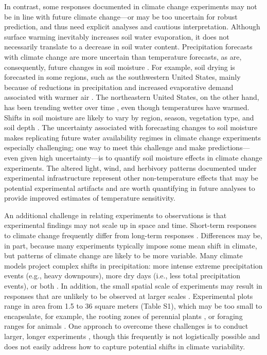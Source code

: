 \documentclass{article}
\begin{document}
\par In contrast, some responses documented in climate change experiments may not be in line with future climate change---or may be too uncertain for robust prediction, and thus need explicit analyses and cautious interpretation. Although surface warming inevitably increases soil water evaporation, it does not necessarily translate to a decrease in soil water content. Precipitation forecasts with climate change are more uncertain than temperature forecasts, as are, consequently, future changes in soil moisture \citep{cook2018}. For example, soil drying is forecasted in some regions, such as the southwestern United States, mainly because of reductions in precipitation and increased evaporative demand associated with warmer air \citep{dai2013,seager2013}. The northeastern United States, on the other hand, has been trending wetter over time \citep{shuman2017}, even though temperatures have warmed. Shifts in soil moisture are likely to vary by region, season, vegetation type, and soil depth \citep{seager2014,berg2017,cook2018}. The uncertainty associated with forecasting changes to soil moisture makes replicating future water availability regimes in climate change experiments especially challenging; one way to meet this challenge and make predictions---even given high uncertainty---is to quantify soil moisture effects in climate change experiments. The altered light, wind, and herbivory patterns documented under experimental infrastructure \citep{kennedy1995,moise2010,wolkovich2012,hoeppner2012, clark2014b} represent other non-temperature effects that may be potential experimental artifacts and are worth quantifying in future analyses to provide improved estimates of temperature sensitivity.
\par An additional challenge in relating experiments to observations is that experimental findings may not scale up in space and time. Short-term responses to climate change frequently differ from long-term responses \citep{woodward1992,elmendorf2012, andresen2016, reich2018}. Differences may be, in part, because many experiments typically impose some mean shift in climate, but patterns of climate change are likely to be more variable. Many climate models project complex shifts in precipitation: more intense extreme precipitation events (e.g., heavy downpours), more dry days (i.e., less total precipitation events), or both \citep{polade2014}. In addition, the small spatial scale of experiments may result in responses that are unlikely to be observed at larger scales \citep{woodward1992,menke2014}. Experimental plots range in area from 1.5 to 36 square meters (Table S1), which may be too small to encapsulate, for example, the rooting zones of perennial plants \citep{canadell1996}, or foraging ranges for animals \citep{menke2014}. One approach to overcome these challenges is to conduct larger, longer experiments \citep{woodward1992}, though this frequently is not logistically possible and does not easily address how to capture potential shifts in climate variability. 
\end{document}
